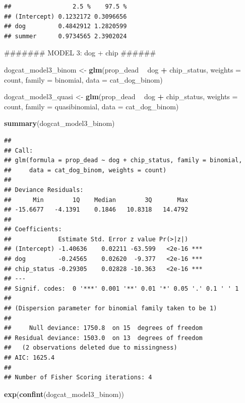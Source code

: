 \documentclass[]{article}
\newenvironment{Shaded}{\begin{snugshade}}{\end{snugshade}}
\newcommand{\KeywordTok}[1]{\textcolor[rgb]{0.13,0.29,0.53}{\textbf{#1}}}
\newcommand{\DataTypeTok}[1]{\textcolor[rgb]{0.13,0.29,0.53}{#1}}
\newcommand{\StringTok}[1]{\textcolor[rgb]{0.31,0.60,0.02}{#1}}
\newcommand{\OperatorTok}[1]{\textcolor[rgb]{0.81,0.36,0.00}{\textbf{#1}}}
\newcommand{\NormalTok}[1]{#1}
\begin{document}
\begin{verbatim}
##                 2.5 %    97.5 %
## (Intercept) 0.1232172 0.3096656
## dog         0.4842912 1.2820599
## summer      0.9734565 2.3902024
\end{verbatim}

\begin{Shaded}
\begin{Highlighting}[]
\NormalTok{####### MODEL 3: dog + chip ######}

\NormalTok{dogcat_model3_binom <-}\StringTok{ }\KeywordTok{glm}\NormalTok{(prop_dead }\OperatorTok{~}\StringTok{ }\NormalTok{dog }\OperatorTok{+}\StringTok{ }\NormalTok{chip_status, }\DataTypeTok{weights =}\NormalTok{ count, }\DataTypeTok{family =}\NormalTok{ binomial, }\DataTypeTok{data =}\NormalTok{ cat_dog_binom)}

\NormalTok{dogcat_model3_quasi <-}\StringTok{ }\KeywordTok{glm}\NormalTok{(prop_dead }\OperatorTok{~}\StringTok{ }\NormalTok{dog }\OperatorTok{+}\StringTok{ }\NormalTok{chip_status, }\DataTypeTok{weights =}\NormalTok{ count, }\DataTypeTok{family =}\NormalTok{ quasibinomial, }\DataTypeTok{data =}\NormalTok{ cat_dog_binom)}

\KeywordTok{summary}\NormalTok{(dogcat_model3_binom)}
\end{Highlighting}
\end{Shaded}

\begin{verbatim}
## 
## Call:
## glm(formula = prop_dead ~ dog + chip_status, family = binomial, 
##     data = cat_dog_binom, weights = count)
## 
## Deviance Residuals: 
##      Min        1Q    Median        3Q       Max  
## -15.6677   -4.1391    0.1846   10.8318   14.4792  
## 
## Coefficients:
##             Estimate Std. Error z value Pr(>|z|)    
## (Intercept) -1.40636    0.02211 -63.599   <2e-16 ***
## dog         -0.24565    0.02620  -9.377   <2e-16 ***
## chip_status -0.29305    0.02828 -10.363   <2e-16 ***
## ---
## Signif. codes:  0 '***' 0.001 '**' 0.01 '*' 0.05 '.' 0.1 ' ' 1
## 
## (Dispersion parameter for binomial family taken to be 1)
## 
##     Null deviance: 1750.8  on 15  degrees of freedom
## Residual deviance: 1503.0  on 13  degrees of freedom
##   (2 observations deleted due to missingness)
## AIC: 1625.4
## 
## Number of Fisher Scoring iterations: 4
\end{verbatim}

\begin{Shaded}
\begin{Highlighting}[]
\KeywordTok{exp}\NormalTok{(}\KeywordTok{confint}\NormalTok{(dogcat_model3_binom))}
\end{Highlighting}
\end{Shaded}
\end{document}
